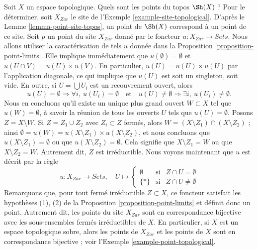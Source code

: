\begin{example}
\label{example-point-topology}
Soit $X$ un espace topologique. Quels sont les points du topos
$\Sh(X)$ ? Pour le déterminer, soit $X_{Zar}$ le site de
l’Exemple \ref{example-site-topological}.
D’après le
Lemme \ref{lemma-point-site-topos},
un point de $\Sh(X)$ correspond à un point de ce site.
Soit $p$ un point du site $X_{Zar}$ donné par le foncteur
$u : X_{Zar} \to \textit{Sets}$. Nous allons utiliser la
caractérisation de tels $u$ donnée dans la
Proposition \ref{proposition-point-limits}.
Elle implique immédiatement que $u(\emptyset) = \emptyset$ et
$u(U \cap V) = u(U) \times u(V)$. En particulier,
$u(U) = u(U) \times u(U)$ par l’application diagonale, ce qui implique que $u(U)$
est soit un singleton, soit vide. En outre, si $U = \bigcup U_i$ est un
recouvrement ouvert, alors
$$
u(U) = \emptyset \Rightarrow \forall i, \ u(U_i) = \emptyset
\quad\text{et}\quad
u(U) \not = \emptyset \Rightarrow \exists i, \ u(U_i) \not = \emptyset.
$$
Nous en concluons qu’il existe un unique plus grand ouvert $W \subset X$ tel que
$u(W) = \emptyset$, à savoir la réunion de tous les ouverts $U$ tels que
$u(U) = \emptyset$. Posons $Z = X \setminus W$. Si $Z = Z_1 \cup Z_2$ avec
$Z_i \subset Z$ fermés, alors $W = (X \setminus Z_1) \cap (X \setminus Z_2)$ ;
ainsi $\emptyset = u(W) = u(X \setminus Z_1) \times u(X \setminus Z_2)$,
et nous concluons que $u(X \setminus Z_1) = \emptyset$ ou que
$u(X \setminus Z_2) = \emptyset$. Cela signifie que $X \setminus Z_1 = W$
ou que $X \setminus Z_2 = W$. Autrement dit, $Z$ est irréductible.
Nous voyons maintenant que $u$ est décrit par la règle
$$
u : X_{Zar} \longrightarrow \textit{Sets}, \quad
U \mapsto
\left\{
\begin{matrix}
\emptyset & \text{si} & Z \cap U = \emptyset \\
\{*\} & \text{si} & Z \cap U \not = \emptyset
\end{matrix}
\right.
$$
Remarquons que, pour tout fermé irréductible $Z \subset X$, ce
foncteur satisfait les hypothèses (1), (2) de la
Proposition \ref{proposition-point-limits}
et définit donc un point. Autrement dit, les points du
site $X_{Zar}$ sont en correspondance bijective avec les
sous-ensembles fermés irréductibles de $X$. En particulier, si $X$ est
un espace topologique sobre, alors les points de $X_{Zar}$ et les
points de $X$ sont en correspondance bijective ; voir
l’Exemple \ref{example-point-topological}.
\end{example}

